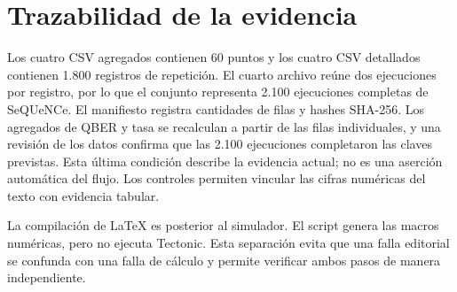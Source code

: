 \section{Trazabilidad de la evidencia}

Los cuatro CSV agregados contienen 60 puntos y los cuatro CSV detallados contienen 1.800 registros de repetición. El cuarto archivo reúne dos ejecuciones por registro, por lo que el conjunto representa 2.100 ejecuciones completas de SeQUeNCe. El manifiesto registra cantidades de filas y hashes SHA-256. Los agregados de QBER y tasa se recalculan a partir de las filas individuales, y una revisión de los datos confirma que las 2.100 ejecuciones completaron las claves previstas. Esta última condición describe la evidencia actual; no es una aserción automática del flujo. Los controles permiten vincular las cifras numéricas del texto con evidencia tabular.

La compilación de LaTeX es posterior al simulador. El script genera las macros numéricas, pero no ejecuta Tectonic. Esta separación evita que una falla editorial se confunda con una falla de cálculo y permite verificar ambos pasos de manera independiente.
